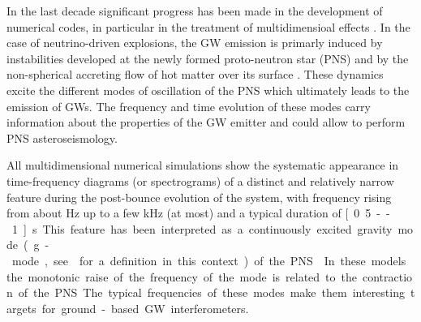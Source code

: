 In the last decade significant progress has been made in the development of numerical codes, {in particular in the treatment of multidimensioal effects \citep{BMueller:2020}.} In the case of  neutrino-driven explosions, the GW emission is {primarly induced by instabilities developed at the newly formed proto-neutron star (PNS) and by the non-spherical accreting flow of hot matter over its surface \citep{Kotake:2017}.  These} dynamics excite the different modes of oscillation of the PNS which ultimately leads to the emission of GWs. The frequency and time evolution of these modes carry information about the properties of the GW emitter and could allow to perform PNS asteroseismology. 



All multidimensional numerical simulations show the systematic appearance in time-frequency diagrams (or spectrograms) of a distinct and relatively narrow feature 
%
%
during the post-bounce evolution of the system, with frequency rising 
from about \unit[100]{Hz} up to a few kHz (at most) and a typical duration of \unit[0.5 -- 1]{s}. This feature has been interpreted as a continuously excited gravity mode (g-mode, see \citep{kokkotas,Friedman:2013} for a definition in this context) of the PNS \citep{murphy:09, mueller:13gw, Cerda:2013, Yakunin:2015, Kuroda:2016, Andresen:2017}. 
In these models the monotonic raise of the frequency of the mode is related to the contraction of the PNS. The {typical} frequencies of {these} modes make them interesting targets for
ground-based GW interferometers. 
 
